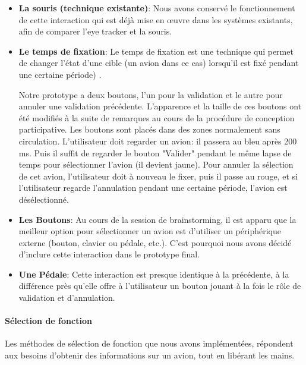 \begin{itemize}

\item \textbf{La souris (technique existante)}: Nous avons conservé le fonctionnement de cette interaction qui est déjà mise en œuvre dans les systèmes existants, afin de comparer l'eye tracker et la souris.

\item \textbf{Le temps de fixation}: Le temps de fixation est une technique qui permet de changer l’état d’une cible (un avion dans ce cas) lorsqu’il est fixé pendant une certaine période) .


Notre prototype a deux boutons, l'un pour la validation et le
autre pour annuler une validation précédente. L'apparence
et la taille de ces boutons ont été modifiés à la suite de remarques au cours de la procédure de conception participative. Les boutons sont placés dans des zones normalement sans circulation. L'utilisateur doit regarder un avion: il passera au bleu après 200 ms. Puis il suffit de regarder le bouton "Valider" pendant le même lapse de temps pour sélectionner l'avion (il devient jaune). Pour annuler la sélection de cet avion, l’utilisateur doit à nouveau le fixer, puis il passe au rouge, et si l’utilisateur regarde l’annulation pendant une certaine période, l’avion est désélectionné.

\item \textbf{Les Boutons}: Au cours de la session de brainstorming, il est apparu que la meilleur
option pour sélectionner un avion est d'utiliser un périphérique externe
(bouton, clavier ou pédale, etc.). C’est pourquoi nous avons décidé d'inclure cette interaction dans le prototype final.

\item \textbf{Une Pédale}: Cette interaction est presque identique à la précédente, à la différence près qu’elle offre à l’utilisateur un bouton jouant à la fois le rôle de validation et d'annulation.

\end{itemize}


\paragraph{Sélection de fonction}
Les méthodes de sélection de fonction que nous avons implémentées,
répondent aux besoins d'obtenir des informations sur un avion, tout en libérant les mains.
 
